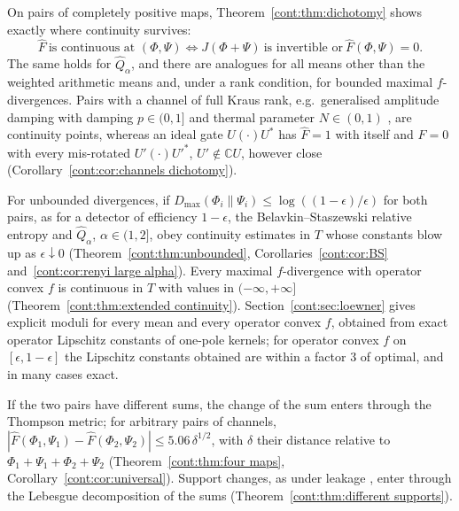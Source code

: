 On pairs of completely positive maps, Theorem~\ref{cont:thm:dichotomy} shows exactly where continuity survives:
\begin{equation}\label{cont:eq:intro dichotomy}
\widehat{F}\ \text{is continuous at }(\Phi,\Psi)\iff J(\Phi+\Psi)\ \text{is invertible or}\ \widehat{F}(\Phi,\Psi)=0 .
\end{equation}
The same holds for $\widehat{Q}_\alpha$, and there are analogues for all means other than the weighted arithmetic means and, under a rank condition, for bounded maximal $f$-divergences. Pairs with a channel of full Kraus rank, e.g.\ generalised amplitude damping with damping $p\in(0,1]$ and thermal parameter $N\in(0,1)$ \cite{KhatriSharmaWilde2020}, are continuity points, whereas an ideal gate $U(\cdot)U^*$ has $\widehat{F}=1$ with itself and $\widehat{F}=0$ with every mis-rotated $U'(\cdot)U'^*$, $U'\notin\mathbb{C}U$, however close (Corollary~\ref{cont:cor:channels dichotomy}).

For unbounded divergences, if $D_{\max}(\Phi_i\|\Psi_i)\leq\log((1-\epsilon)/\epsilon)$ for both pairs, as for a detector of efficiency $1-\epsilon$, the Belavkin--Staszewski relative entropy and $\widehat{Q}_\alpha$, $\alpha\in(1,2]$, obey continuity estimates in $T$ whose constants blow up as $\epsilon\downarrow0$ (Theorem~\ref{cont:thm:unbounded}, Corollaries~\ref{cont:cor:BS} and~\ref{cont:cor:renyi large alpha}). Every maximal $f$-divergence with operator convex $f$ is continuous in $T$ with values in $(-\infty,+\infty]$ (Theorem~\ref{cont:thm:extended continuity}).
Section~\ref{cont:sec:loewner} gives explicit moduli for every mean and every operator convex $f$, obtained from exact operator Lipschitz constants of one-pole kernels; for operator convex $f$ on $[\epsilon,1-\epsilon]$ the Lipschitz constants obtained are within a factor $3$ of optimal, and in many cases exact.

If the two pairs have different sums, the change of the sum enters through the Thompson metric; for arbitrary pairs of channels, $|\widehat{F}(\Phi_1,\Psi_1)-\widehat{F}(\Phi_2,\Psi_2)|\leq5.06\,\delta^{1/2}$, %
 with $\delta$ their distance relative to $\Phi_1+\Psi_1+\Phi_2+\Psi_2$ (Theorem~\ref{cont:thm:four maps}, Corollary~\ref{cont:cor:universal}). Support changes, as under leakage \cite{WoodGambetta2018}, enter through the Lebesgue decomposition of the sums (Theorem~\ref{cont:thm:different supports}).

